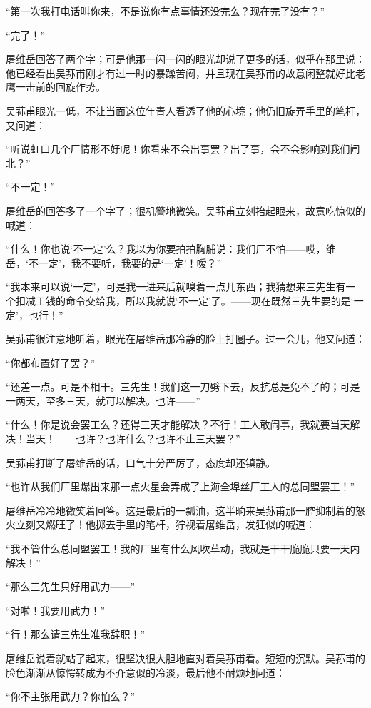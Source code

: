 \par “第一次我打电话叫你来，不是说你有点事情还没完么？现在完了没有？”
\par “完了！”
\par 屠维岳回答了两个字；可是他那一闪一闪的眼光却说了更多的话，似乎在那里说：他已经看出吴荪甫刚才有过一时的暴躁苦闷，并且现在吴荪甫的故意闲整就好比老鹰一击前的回旋作势。
\par 吴荪甫眼光一低，不让当面这位年青人看透了他的心境；他仍旧旋弄手里的笔杆，又问道：
\par “听说虹口几个厂情形不好呢！你看来不会出事罢？出了事，会不会影响到我们闸北？”
\par “不一定！”
\par 屠维岳的回答多了一个字了；很机警地微笑。吴荪甫立刻抬起眼来，故意吃惊似的喊道：
\par “什么！你也说‘不一定’么？我以为你要拍拍胸脯说：我们厂不怕——哎，维岳，‘不一定’，我不要听，我要的是‘一定’！嗳？”
\par “我本来可以说‘一定’，可是我一进来后就嗅着一点儿东西；我猜想来三先生有一个扣减工钱的命令交给我，所以我就说‘不一定’了。——现在既然三先生要的是‘一定’，也行！”
\par 吴荪甫很注意地听着，眼光在屠维岳那冷静的脸上打圈子。过一会儿，他又问道：
\par “你都布置好了罢？”
\par “还差一点。可是不相干。三先生！我们这一刀劈下去，反抗总是免不了的；可是一两天，至多三天，就可以解决。也许——”
\par “什么！你是说会罢工么？还得三天才能解决？不行！工人敢闹事，我就要当天解决！当天！——也许？也许什么？也许不止三天罢？”
\par 吴荪甫打断了屠维岳的话，口气十分严厉了，态度却还镇静。
\par “也许从我们厂里爆出来那一点火星会弄成了上海全埠丝厂工人的总同盟罢工！”
\par 屠维岳冷冷地微笑着回答。这是最后的一瓢油，这半晌来吴荪甫那一腔抑制着的怒火立刻又燃旺了！他掷去手里的笔杆，狞视着屠维岳，发狂似的喊道：
\par “我不管什么总同盟罢工！我的厂里有什么风吹草动，我就是干干脆脆只要一天内解决！”
\par “那么三先生只好用武力——”
\par “对啦！我要用武力！”
\par “行！那么请三先生准我辞职！”
\par 屠维岳说着就站了起来，很坚决很大胆地直对着吴荪甫看。短短的沉默。吴荪甫的脸色渐渐从惊愕转成为不介意似的冷淡，最后他不耐烦地问道：
\par “你不主张用武力？你怕么？”
